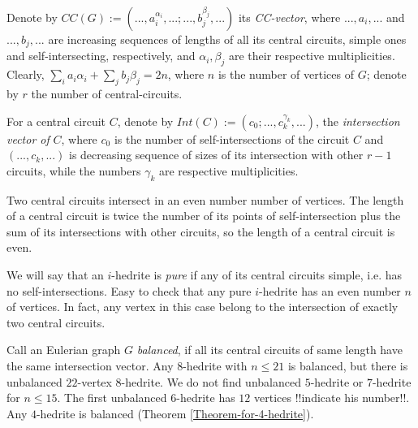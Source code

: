 \documentclass[12pt]{article}
\begin{document}


Denote by 
$CC(G):=(...,a_i^{\alpha_i},...;...,b_j^{\beta_j},...)$ its {\it CC-vector}, 
where $...,a_i,...$ and  $...,b_j,...$ are increasing sequences of lengths of 
all its central circuits, simple ones and self-intersecting, respectively, 
and $\alpha_i, \beta_j$ are their respective multiplicities.
Clearly, $\sum_{i} a_i{\alpha_i}+ \sum_{j} b_j{\beta_j}=2n$, where 
$n$ is the number of vertices of $G$; denote by $r$ the number of 
central-circuits.


For a central circuit $C$, denote by $Int(C):=(c_0;...,c_k^{\gamma_k},...)$,
the {\em intersection vector of} $C$, where $c_0$ is
the number of self-intersections of the circuit $C$ and $(...,c_k,...)$ is
decreasing sequence of sizes of its intersection with other $r-1$ 
circuits, while the numbers $\gamma_k$ are respective multiplicities.


Two central circuits intersect in an even number number of vertices. 
The length of a central circuit is twice the number of its points of 
self-intersection plus the sum of its intersections with other circuits, 
so the length of a central circuit is even.



We will say that an $i$-hedrite is {\it pure} if any of its central circuits 
simple, i.e. has no self-intersections.
Easy to check that any pure $i$-hedrite has an even number $n$ of 
vertices. In fact, any vertex in this case belong to the intersection 
of exactly two central circuits.


Call an Eulerian graph $G$ {\it balanced}, if all its central circuits of
same length have the same intersection vector.
Any $8$-hedrite with $n \le 21$ is balanced, but there is unbalanced $22$-vertex $8$-hedrite. We do not find unbalanced $5$-hedrite or 
$7$-hedrite for $n\leq 15$. The first unbalanced $6$-hedrite 
has $12$ vertices !!indicate his number!!. Any $4$-hedrite is 
balanced (Theorem \ref{Theorem-for-4-hedrite}).
\end{document}
